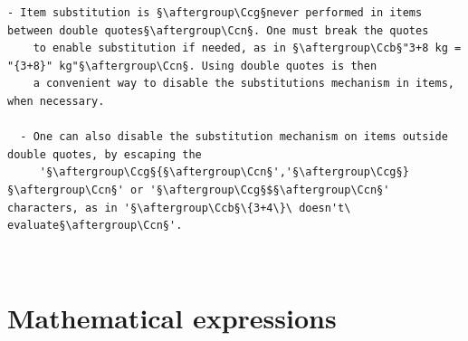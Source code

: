 \documentclass[a4paper,10.5pt,twoside]{book}
\def\Ccb{\color{cb}}
\def\Ccg{\color{cc}}
\def\Ccn{\color{black}}
\begin{document}
\begin{lstlisting}[escapechar=§]
  - Item substitution is §\aftergroup\Ccg§never performed in items between double quotes§\aftergroup\Ccn§. One must break the quotes 
    to enable substitution if needed, as in §\aftergroup\Ccb§"3+8 kg = "{3+8}" kg"§\aftergroup\Ccn§. Using double quotes is then 
    a convenient way to disable the substitutions mechanism in items, when necessary. 
 
  - One can also disable the substitution mechanism on items outside double quotes, by escaping the 
     '§\aftergroup\Ccg§{§\aftergroup\Ccn§','§\aftergroup\Ccg§}§\aftergroup\Ccn§' or '§\aftergroup\Ccg§$§\aftergroup\Ccn§' characters, as in '§\aftergroup\Ccb§\{3+4\}\ doesn't\ evaluate§\aftergroup\Ccn§'.
\end{lstlisting}
\normalsize
~\\\section{Mathematical expressions}
\small
\end{document}
